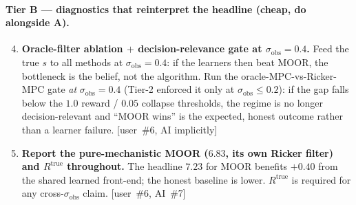 \documentclass[11pt]{article}
\newcommand{\sobs}{\sigma_{\mathrm{obs}}}
\newcommand{\Rtrue}{R^{\mathrm{true}}}
\begin{document}
\paragraph{Tier B --- diagnostics that reinterpret the headline (cheap, do alongside A).}
\begin{enumerate}[leftmargin=1.8em,nosep]
\setcounter{enumi}{3}
\item \textbf{Oracle-filter ablation $+$ decision-relevance gate at $\sobs{=}0.4$.}
Feed the true $s$ to all methods at $\sobs{=}0.4$: if the learners then beat MOOR,
the bottleneck is the belief, not the algorithm. Run the oracle-MPC-vs-Ricker-MPC
gate \emph{at} $\sobs{=}0.4$ (Tier-2 enforced it only at $\sobs\!\le\!0.2$): if the
gap falls below the $1.0$ reward / $0.05$ collapse thresholds, the regime is no
longer decision-relevant and ``MOOR wins'' is the expected, honest outcome rather
than a learner failure. [user~\#6, AI implicitly]
\item \textbf{Report the pure-mechanistic MOOR ($6.83$, its own Ricker filter) and
$\Rtrue$ throughout.} The headline $7.23$ for MOOR benefits $+0.40$ from the shared
learned front-end; the honest baseline is lower. $\Rtrue$ is required for any
cross-$\sobs$ claim. [user~\#6, AI~\#7]
\end{enumerate}
\end{document}
